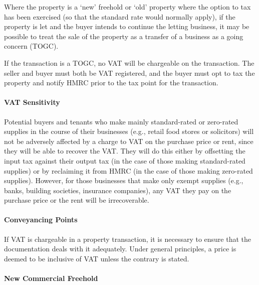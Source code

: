 \documentclass[
]{article}
\begin{document}
Where the property is a `new' freehold or `old' property where the
option to tax has been exercised (so that the standard rate would
normally apply), if the property is let and the buyer intends to
continue the letting business, it may be possible to treat the sale of
the property as a transfer of a business as a going concern (TOGC).

If the transaction is a TOGC, no VAT will be chargeable on the
transaction. The seller and buyer must both be VAT registered, and the
buyer must opt to tax the property and notify HMRC prior to the tax
point for the transaction.

\hypertarget{vat-sensitivity}{%
\paragraph{VAT Sensitivity}\label{vat-sensitivity}}

Potential buyers and tenants who make mainly standard-rated or
zero-rated supplies in the course of their businesses (e.g., retail food
stores or solicitors) will not be adversely affected by a charge to VAT
on the purchase price or rent, since they will be able to recover the
VAT. They will do this either by offsetting the input tax against their
output tax (in the case of those making standard-rated supplies) or by
reclaiming it from HMRC (in the case of those making zero-rated
supplies). However, for those businesses that make only exempt supplies
(e.g., banks, building societies, insurance companies), any VAT they pay
on the purchase price or the rent will be irrecoverable.

\hypertarget{conveyancing-points}{%
\paragraph{Conveyancing Points}\label{conveyancing-points}}

If VAT is chargeable in a property transaction, it is necessary to
ensure that the documentation deals with it adequately. Under general
principles, a price is deemed to be inclusive of VAT unless the contrary
is stated.

\hypertarget{new-commercial-freehold}{%
\paragraph{New Commercial Freehold}\label{new-commercial-freehold}}
\end{document}
